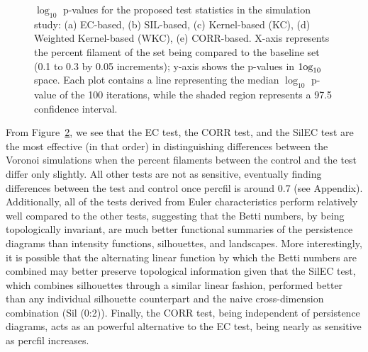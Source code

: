 \documentclass[12pt]{article}
\newcommand{\figref}[1]{Figure~\ref{#1}}
\begin{document}
\begin{center}
\begin{figure}[htp!]
\begin{subfigure}{.45\textwidth}
      \label{fig:sub_corr}
    \end{subfigure}
  \caption{$\log_{10}$ p-values for the proposed test statistics in the simulation study: (a) EC-based, (b) SIL-based, (c) Kernel-based (KC), (d) Weighted Kernel-based (WKC), (e) CORR-based. X-axis represents the percent filament of the set being compared to the baseline set (0.1 to 0.3 by 0.05 increments); y-axis shows the p-values in $\textup{1og}_{10}$ space. Each plot contains a line representing the median $\log_{10}$ p-value of the 100 iterations, while the shaded region represents a 97.5 confidence interval.}
  \label{fig:sub_unstandardized_results}
  \end{figure}
\end{center}

From \figref{fig:sub_unstandardized_results}, we see  that the EC test, the CORR test, and the SilEC test are the most effective (in that order) in distinguishing differences between the Voronoi simulations when the percent filaments between the control and the test differ only slightly. All other tests are not as sensitive, eventually finding differences between the test and control once percfil is around 0.7 (see Appendix). Additionally, all of the tests derived from Euler characteristics perform relatively well compared to the other tests, suggesting that the Betti numbers, by being topologically invariant, are much better functional summaries of the persistence diagrams than intensity functions, silhouettes, and landscapes. More interestingly, it is possible that the alternating linear function by which the Betti numbers are combined may better preserve topological information given that the SilEC test, which combines silhouettes through a similar linear fashion, performed better than any individual silhouette counterpart and the naive cross-dimension combination (Sil (0:2)). Finally, the CORR test, being independent of persistence diagrams, acts as an powerful alternative to the EC test, being nearly as sensitive as percfil increases.
\end{document}
